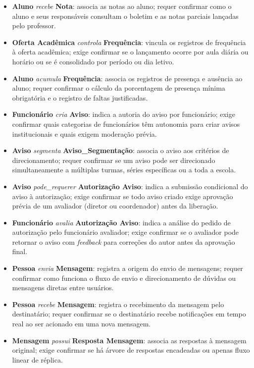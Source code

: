 \documentclass[a4paper,12pt]{report}
\begin{document}
\begin{itemize}
    \item \textbf{Aluno} \textit{recebe} \textbf{Nota}: associa as notas ao aluno; requer confirmar como o aluno e seus responsáveis consultam o boletim e as notas parciais lançadas pelo professor.
    \item \textbf{Oferta Acadêmica} \textit{controla} \textbf{Frequência}: vincula os registros de frequência à oferta acadêmica; exige confirmar se o lançamento ocorre por aula diária ou horário ou se é consolidado por período ou dia letivo.
    \item \textbf{Aluno} \textit{acumula} \textbf{Frequência}: associa os registros de presença e ausência ao aluno; requer confirmar o cálculo da porcentagem de presença mínima obrigatória e o registro de faltas justificadas.
    \item \textbf{Funcionário} \textit{cria} \textbf{Aviso}: indica a autoria do aviso por funcionário; exige confirmar quais categorias de funcionários têm autonomia para criar avisos institucionais e quais exigem moderação prévia.
    \item \textbf{Aviso} \textit{segmenta} \textbf{Aviso\_Segmentação}: associa o aviso aos critérios de direcionamento; requer confirmar se um aviso pode ser direcionado simultaneamente a múltiplas turmas, séries específicas ou a toda a escola.
    \item \textbf{Aviso} \textit{pode\_requerer} \textbf{Autorização Aviso}: indica a submissão condicional do aviso à autorização; exige confirmar se todo aviso criado exige aprovação prévia de um avaliador (diretor ou coordenador) antes da liberação.
    \item \textbf{Funcionário} \textit{avalia} \textbf{Autorização Aviso}: indica a análise do pedido de autorização pelo funcionário avaliador; exige confirmar se o avaliador pode retornar o aviso com \textit{feedback} para correções do autor antes da aprovação final.
    \item \textbf{Pessoa} \textit{envia} \textbf{Mensagem}: registra a origem do envio de mensagens; requer confirmar como funciona o fluxo de envio e direcionamento de dúvidas ou mensagens diretas entre usuários.
    \item \textbf{Pessoa} \textit{recebe} \textbf{Mensagem}: registra o recebimento da mensagem pelo destinatário; requer confirmar se o destinatário recebe notificações em tempo real ao ser acionado em uma nova mensagem.
    \item \textbf{Mensagem} \textit{possui} \textbf{Resposta Mensagem}: associa as respostas à mensagem original; exige confirmar se há árvore de respostas encadeadas ou apenas fluxo linear de réplica.

\end{itemize}
\end{document}
